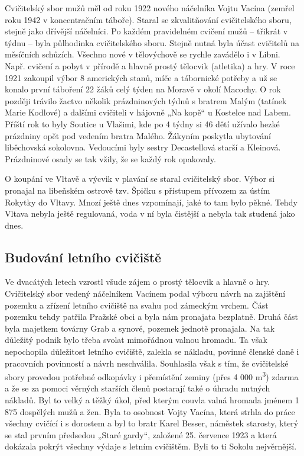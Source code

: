 Cvičitelský sbor mužů měl od roku 1922 nového náčelníka Vojtu Vacína
(zemřel roku 1942 v koncentračním táboře). Staral se zkvalitňování
cvičitelského sboru, stejně jako dřívější náčelníci. Po každém
pravidelném cvičení mužů -- třikrát v týdnu -- byla půlhodinka
cvičitelského sboru. Stejně nutná byla účast cvičitelů na měsíčních
schůzích. Všechno nové v tělovýchově se rychle zavádělo i v Libni. Např.
cvičení a pobyt v přírodě a hlavně prostý tělocvik (atletika) a hry. V
roce 1921 zakoupil výbor 8 amerických stanů, míče a tábornické potřeby a
už se konalo první táboření 22 žáků celý týden na Moravě v okolí
Macochy. O rok později trávilo žactvo několik prázdninových týdnů s
bratrem Malým (tatínek Marie Kodlové) a dalšími cvičiteli v hájovně „Na
kopě`` u Kostelce nad Labem. Příští rok to byly Soutice u Vlašimi, kde
po 4 týdny si 46 dětí užívalo hezké prázdniny opět pod vedením bratra
Malého. Žákyním poskytla ubytování liběchovská sokolovna. Vedoucími byly
sestry Decastellová starší a Kleinová. Prázdninové osady se tak vžily,
že se každý rok opakovaly.

O koupání ve Vltavě a výcvik v plavání se staral cvičitelský sbor. Výbor
si pronajal na libeňském ostrově tzv. Špičku s přístupem přívozem za
ústím Rokytky do Vltavy. Mnozí ještě dnes vzpomínají, jaké to tam bylo
pěkné. Tehdy Vltava nebyla ještě regulovaná, voda v ní byla čistější a
nebyla tak studená jako dnes.

\subsection{Budování letního
cvičiště}\label{budovuxe1nuxed-letnuxedho-cviux10diux161tux11b}

Ve dvacátých letech vzrostl všude zájem o prostý tělocvik a hlavně o
hry. Cvičitelský sbor vedený náčelníkem Vacínem podal výboru návrh na
zajištění pozemku a zřízení letního cvičiště na svahu pod zámeckým
vrchem. Část pozemku tehdy patřila Pražské obci a byla nám pronajata
bezplatně. Druhá část byla majetkem továrny Grab a synové, pozemek
jednotě pronajala. Na tak důležitý podnik bylo třeba svolat mimořádnou
valnou hromadu. Ta však nepochopila důležitost letního cvičiště, zalekla
se nákladu, povinné členské daně i pracovních povinností a návrh
neschválila. Souhlasila však s tím, že cvičitelské sbory provedou
potřebné odkopávky i přemístění zeminy (přes 4 000 m\textsuperscript{3})
zdarma a že se za pomoci věrných starších členů postarají také o úhradu
nutných nákladů. Byl to velký a těžký úkol, před kterým couvla valná
hromada jménem 1 875 dospělých mužů a žen. Byla to osobnost Vojty
Vacína, která strhla do práce všechny cvičící i s dorostem a byl to
bratr Karel Besser, náměstek starosty, který se stal prvním předsedou
„Staré gardy``, založené 25. července 1923 a která dokázala pokrýt
všechny výdaje s letním cvičištěm. Byli to ti Sokolu nejvěrnější.

